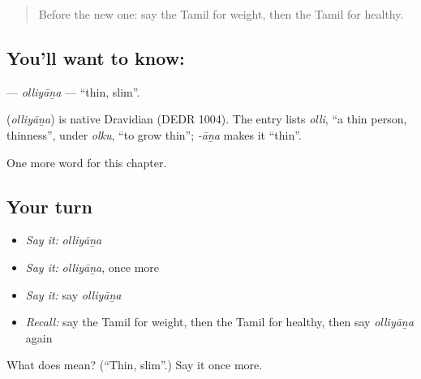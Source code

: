 \label{lesson:TA-C238-olliyana}



\begin{quote}
Before the new one: say the Tamil for weight, then the Tamil for healthy.
\end{quote}

\subsection*{You'll want to know: }
\textbf{} — \emph{olliyāṉa} — \textquotedblleft{}thin, slim\textquotedblright{}.

\begin{cousinweb}
\textbf{} (\emph{olliyāṉa}) is native Dravidian (DEDR 1004). The entry lists \emph{olli}, \textquotedblleft{}a thin person, thinness\textquotedblright{}, under \emph{olku}, \textquotedblleft{}to grow thin\textquotedblright{}; \emph{-āṉa} makes it \textquotedblleft{}thin\textquotedblright{}.
\end{cousinweb}

\begin{grammarlens}[title={What you've built}]
One more word for this chapter.
\end{grammarlens}

\subsection*{Your turn}
\begin{itemize}
\raggedright
  \item \emph{Say it:} \emph{olliyāṉa}
  \item \emph{Say it:} \emph{olliyāṉa}, once more
  \item \emph{Say it:} say \emph{olliyāṉa}
  \item \emph{Recall:} say the Tamil for weight, then the Tamil for healthy, then say \emph{olliyāṉa} again
\end{itemize}

\begin{tcolorbox}[breakable,colback=teal!4,colframe=teal!35!black,title={Before you move on}]
What does  mean? (\textquotedblleft{}Thin, slim\textquotedblright{}.) Say it once more.
\end{tcolorbox}
